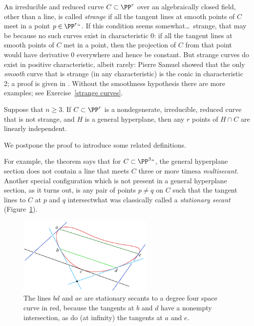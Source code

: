 An irreducible and reduced curve
$C\subset \PP^r$ over an algebraically closed field,
other than a
%
line, is called \emph{strange} if
all the tangent lines at smooth points of $C$ meet in a point $p\in \PP^r``$.
If this condition seems somewhat\dots\ strange, that may be because no
such curves exist in characteristic 0: if
all the
tangent lines at smooth points of $C$ met in a point, then the projection
of $C$ from that point would have derivative 0 everywhere and hence be
constant. But strange curves do exist in
positive
characteristic, albeit
%
rarely: Pierre Samuel showed that the only \emph{smooth} curve that is
strange (in any characteristic) is the conic in
characteristic 2;
a proof
is given in \cite[Theorem IV.3.9]{Hartshorne1977}. Without the smoothness
hypothesis there are more examples; see Exercise~\ref{strange curves}.



\begin{npt}
\begin{theorem}
\label{basic linear independence}\label{linear general position}
%
Suppose that $n\geq 3$. If $C\subset \PP^r$ is a nondegenerate,
irreducible, reduced curve
that is not strange,
and $H$ is a general hyperplane, then any $r$ points of $H\cap C$ are
linearly independent.
\unif
\end{theorem}
\end{npt}

We postpone the proof to introduce some related definitions.

For example, the theorem says that for $C \subset \PP^3` `$, the general
hyperplane section does not contain a line
%
that meets $C$ three or more times\emdash a \emph{multisecant}. Another
special configuration which is not present in a general hyperplane
section, as it turns out,
is any pair of points $p\neq q$ on $C$ such that the tangent lines
to $C$ at $p$ and $q$ intersect\emdash what was
classically
%
called a
\textit{stationary secant}
(Figure~\ref{Fig9.1}).

\begin{figure}
\includegraphics[height=1.5in]{main/cradle-good}
\caption{The lines $bd$ and $ae$ are stationary secants to a degree
  four space curve in red, because the tangents at $b$ and $d$
  have a nonempty intersection, as do (at infinity) the tangents at
  $a$ and $e$.}
\label{Fig9.1}
\end{figure}


